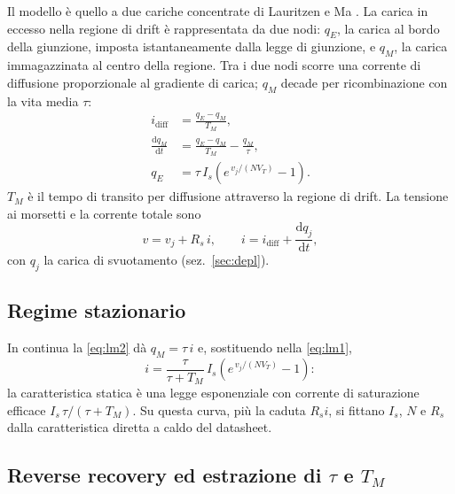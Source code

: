 \documentclass[11pt,a4paper]{article}
\newcommand{\ud}{\mathrm{d}}
\begin{document}
Il modello \`e quello a due cariche concentrate di Lauritzen e Ma
\cite{lauritzen1991}. La carica in eccesso nella regione di drift \`e
rappresentata da due nodi: $q_E$, la carica al bordo della giunzione,
imposta istantaneamente dalla legge di giunzione, e $q_M$, la carica
immagazzinata al centro della regione. Tra i due nodi scorre una
corrente di diffusione proporzionale al gradiente di carica; $q_M$
decade per ricombinazione con la vita media $\tau$:
\begin{align}
i_{\mathrm{diff}} &= \frac{q_E - q_M}{T_M},
\label{eq:lm1}\\[2pt]
\frac{\ud q_M}{\ud t} &= \frac{q_E - q_M}{T_M} - \frac{q_M}{\tau},
\label{eq:lm2}\\[2pt]
q_E &= \tau\, I_s \left( e^{\,v_j/(N V_T)} - 1 \right).
\label{eq:lm3}
\end{align}
$T_M$ \`e il tempo di transito per diffusione attraverso la regione di
drift. La tensione ai morsetti e la corrente totale sono
\begin{equation}
v = v_j + R_s\, i,
\qquad
i = i_{\mathrm{diff}} + \frac{\ud q_j}{\ud t},
\end{equation}
con $q_j$ la carica di svuotamento (sez.~\ref{sec:depl}).

\subsection{Regime stazionario}

In continua la \eqref{eq:lm2} d\`a $q_M = \tau\, i$ e, sostituendo nella
\eqref{eq:lm1},
\begin{equation}
i = \frac{\tau}{\tau + T_M}\, I_s
\left( e^{\,v_j/(N V_T)} - 1 \right):
\label{eq:static}
\end{equation}
la caratteristica statica \`e una legge esponenziale con corrente di
saturazione efficace $I_s\,\tau/(\tau+T_M)$. Su questa curva, pi\`u la
caduta $R_s i$, si fittano $I_s$, $N$ e $R_s$ dalla caratteristica
diretta a caldo del datasheet.

\subsection{Reverse recovery ed estrazione di $\tau$ e $T_M$}
\label{sec:rr}
\end{document}
